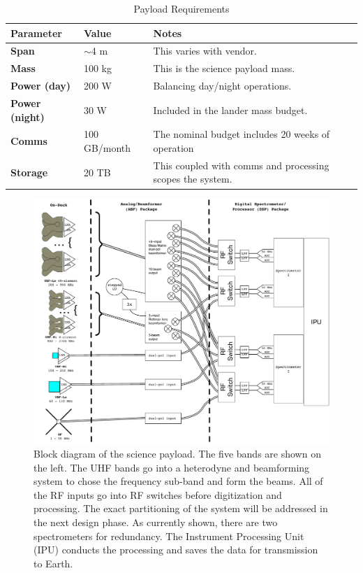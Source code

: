 \begin{table}
    \caption{Payload Requirements}
    \begin{tabular}{|l|l|l|} \hline
    \textbf{Parameter} & \textbf{Value} & \textbf{Notes} \\ \hline
    \textbf{Span} & $\sim$4 m & This varies with vendor. \\ \hline
    \textbf{Mass} & 100 kg & This is the science payload mass. \\ \hline
    \textbf{Power (day)} & 200 W & Balancing day/night operations. \\ \hline
    \textbf{Power (night)} & 30 W & Included in the lander mass budget. \\ \hline
    \textbf{Comms} & 100 GB/month & The nominal budget includes 20 weeks of operation \\ \hline
    \textbf{Storage} & 20 TB & This coupled with comms and processing scopes the system. \\ \hline
    \end{tabular}
    \label{tab:constraints}
\end{table}


\begin{figure}
	\centering
	\includegraphics[width=\linewidth]{figures/SciencePayload.pdf}
	\caption{Block diagram of the science payload.  The five bands are shown on the left.  The UHF bands go into a heterodyne and beamforming system to chose the frequency sub-band and form the beams.  All of the RF inputs go into RF switches before digitization and processing.  The exact partitioning of the system will be addressed in the next design phase.  As currently shown, there are two spectrometers for redundancy.  The Instrument Processing Unit (IPU) conducts the processing and saves the data for transmission to Earth.\label{fig:block}}
\end{figure}


